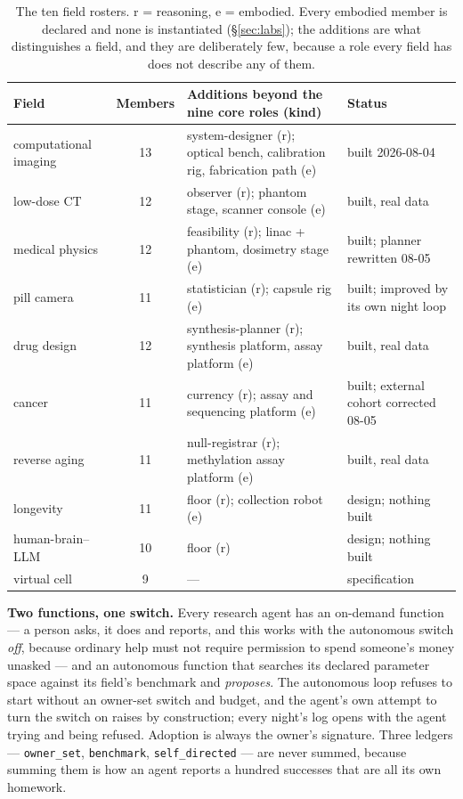 \begin{table}[!htbp]
\centering\scriptsize
\begin{tabularx}{\textwidth}{@{}lcYl@{}}
\toprule
Field & Members & Additions beyond the nine core roles (kind) & Status \\
\midrule
computational imaging & 13 & system-designer (r); optical bench, calibration rig, fabrication path (e) & built 2026-08-04 \\
low-dose CT & 12 & observer (r); phantom stage, scanner console (e) & built, real data \\
medical physics & 12 & feasibility (r); linac + phantom, dosimetry stage (e) & built; planner rewritten 08-05 \\
pill camera & 11 & statistician (r); capsule rig (e) & built; improved by its own night loop \\
drug design & 12 & synthesis-planner (r); synthesis platform, assay platform (e) & built, real data \\
cancer & 11 & currency (r); assay and sequencing platform (e) & built; external cohort corrected 08-05 \\
reverse aging & 11 & null-registrar (r); methylation assay platform (e) & built, real data \\
longevity & 11 & floor (r); collection robot (e) & design; nothing built \\
human-brain--LLM & 10 & floor (r) & design; nothing built \\
virtual cell & 9 & --- & specification \\
\bottomrule
\end{tabularx}
\caption{The ten field rosters. r = reasoning, e = embodied. Every embodied member is declared and none is instantiated (\S\ref{sec:labs}); the additions are what distinguishes a field, and they are deliberately few, because a role every field has does not describe any of them.}
\label{tab:rosters}
\end{table}

\textbf{Two functions, one switch.} Every research agent has an on-demand function --- a person asks, it does and reports, and this works with the autonomous switch \emph{off}, because ordinary help must not require permission to spend someone's money unasked --- and an autonomous function that searches its declared parameter space against its field's benchmark and \emph{proposes}. The autonomous loop refuses to start without an owner-set switch and budget, and the agent's own attempt to turn the switch on raises by construction; every night's log opens with the agent trying and being refused. Adoption is always the owner's signature. Three ledgers --- \texttt{owner\_set}, \texttt{benchmark}, \texttt{self\_directed} --- are never summed, because summing them is how an agent reports a hundred successes that are all its own homework.

